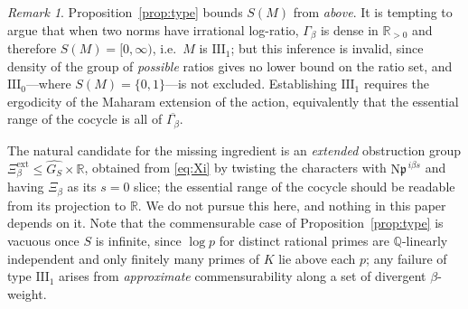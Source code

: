 \documentclass[11pt]{amsart}
\numberwithin{equation}{section}
\theoremstyle{definition}
\theoremstyle{remark}
\newtheorem{remark}[theorem]{Remark}
\newcommand{\Q}{\mathbb{Q}}
\newcommand{\R}{\mathbb{R}}
\newcommand{\Ns}{\mathrm{N}}
\newcommand{\pp}{\mathfrak{p}}
\begin{document}
\begin{remark}\label{rem:typewarning}
Proposition~\ref{prop:type} bounds $S(M)$ from \emph{above}. It is tempting to argue that
when two norms have irrational log-ratio, $\Gamma_\beta$ is dense in $\R_{>0}$ and therefore
$S(M)=[0,\infty)$, i.e.\ $M$ is $\mathrm{III}_1$; but this inference is invalid, since
density of the group of \emph{possible} ratios gives no lower bound on the ratio set, and
$\mathrm{III}_0$---where $S(M)=\{0,1\}$---is not excluded. Establishing $\mathrm{III}_1$
requires the ergodicity of the Maharam extension of the action, equivalently that the
essential range of the cocycle is all of $\overline{\Gamma_\beta}$.

The natural candidate for the missing ingredient is an \emph{extended} obstruction group
$\Xi_\beta^{\mathrm{ext}}\le\widehat{G_S}\times\R$, obtained from \eqref{eq:Xi} by twisting
the characters with $\Ns\pp^{\,i\beta s}$ and having $\Xi_\beta$ as its $s=0$ slice; the
essential range of the cocycle should be readable from its projection to $\R$. We do not
pursue this here, and nothing in this paper depends on it. Note that the commensurable case
of Proposition~\ref{prop:type} is vacuous once $S$ is infinite, since $\log p$ for distinct
rational primes are $\Q$-linearly independent and only finitely many primes of $K$ lie
above each $p$; any failure of type $\mathrm{III}_1$ arises from \emph{approximate}
commensurability along a set of divergent $\beta$-weight.
\end{remark}
\end{document}

